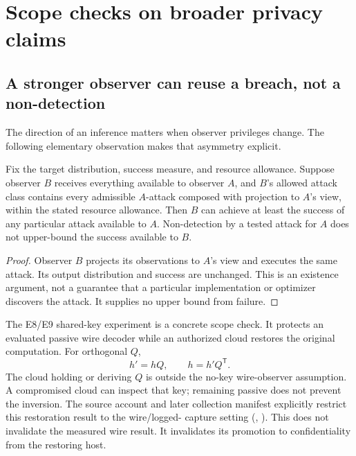 \FloatBarrier
\section{Scope checks on broader privacy claims}
\label{sec:scopechecks}

\subsection{A stronger observer can reuse a breach, not a non-detection}

The direction of an inference matters when observer privileges change.
The following elementary observation makes that asymmetry explicit.

\begin{samepage}
\begin{proposition}
Fix the target distribution, success measure, and resource allowance.
Suppose observer $B$ receives everything available to observer $A$, and
$B$'s allowed attack class contains every admissible $A$-attack composed
with projection to $A$'s view, within the stated resource allowance.
Then $B$ can achieve at least the success of any particular
attack available to $A$. Non-detection by a tested attack for $A$ does not
upper-bound the success available to $B$.
\end{proposition}
\begin{proof}
Observer $B$ projects its observations to $A$'s view and executes the same
attack. Its output distribution and success are unchanged. This is an
existence argument, not a guarantee that a particular implementation or
optimizer discovers the attack. It supplies no upper bound from failure.
\end{proof}
\end{samepage}

The E8/E9 shared-key experiment is a concrete scope check. It protects an
evaluated passive wire decoder while an authorized cloud restores the
original computation. For orthogonal $Q$,
\begin{equation}
 h'=hQ,\qquad h=h'Q^{\mathsf T}.
 \label{eq:rotation}
\end{equation}
The cloud holding or deriving $Q$ is outside the no-key wire-observer
assumption. A compromised cloud can inspect that key; remaining passive
does not prevent the inversion. The source account and later collection
manifest explicitly restrict this restoration result to the wire/logged-
capture setting (, ). This does not invalidate
the measured wire result. It invalidates its promotion to confidentiality
from the restoring host.

